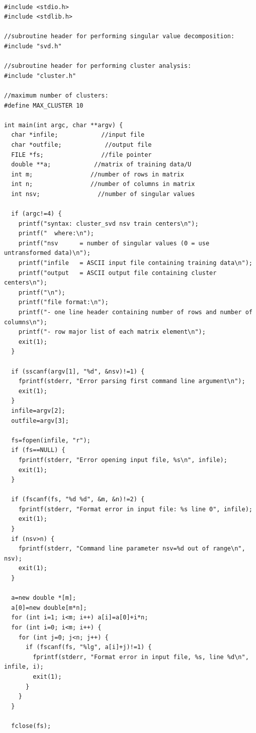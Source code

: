 \documentclass{article}
\begin{document}
\begin{verbatim}

#include <stdio.h>
#include <stdlib.h>

//subroutine header for performing singular value decomposition:
#include "svd.h"

//subroutine header for performing cluster analysis:
#include "cluster.h"

//maximum number of clusters:
#define MAX_CLUSTER 10

int main(int argc, char **argv) {
  char *infile;            //input file
  char *outfile;            //output file
  FILE *fs;                //file pointer
  double **a;            //matrix of training data/U
  int m;                //number of rows in matrix
  int n;                //number of columns in matrix
  int nsv;                //number of singular values

  if (argc!=4) {
    printf("syntax: cluster_svd nsv train centers\n");
    printf("  where:\n");
    printf("nsv      = number of singular values (0 = use untransformed data)\n");
    printf("infile   = ASCII input file containing training data\n");
    printf("output   = ASCII output file containing cluster centers\n");
    printf("\n");
    printf("file format:\n");
    printf("- one line header containing number of rows and number of columns\n");
    printf("- row major list of each matrix element\n");
    exit(1);
  }

  if (sscanf(argv[1], "%d", &nsv)!=1) {
    fprintf(stderr, "Error parsing first command line argument\n");
    exit(1);
  }
  infile=argv[2];
  outfile=argv[3];

  fs=fopen(infile, "r");
  if (fs==NULL) {
    fprintf(stderr, "Error opening input file, %s\n", infile);
    exit(1);
  }

  if (fscanf(fs, "%d %d", &m, &n)!=2) {
    fprintf(stderr, "Format error in input file: %s line 0", infile);
    exit(1);
  }
  if (nsv>n) {
    fprintf(stderr, "Command line parameter nsv=%d out of range\n", nsv);
    exit(1);
  }

  a=new double *[m];
  a[0]=new double[m*n];
  for (int i=1; i<m; i++) a[i]=a[0]+i*n;
  for (int i=0; i<m; i++) {
    for (int j=0; j<n; j++) {
      if (fscanf(fs, "%lg", a[i]+j)!=1) {
        fprintf(stderr, "Format error in input file, %s, line %d\n", infile, i);
        exit(1);
      }
    }
  }

  fclose(fs);

\end{verbatim}
\end{document}
